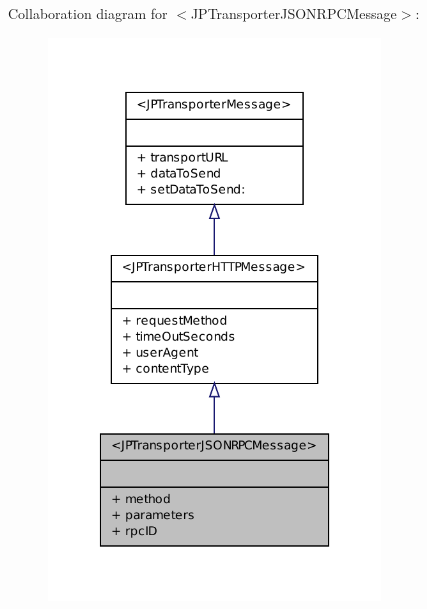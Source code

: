 Collaboration diagram for $<$JPTransporterJSONRPCMessage$>$:\nopagebreak
\begin{figure}[H]
\begin{center}
\leavevmode
\includegraphics[width=250pt]{a00171}
\end{center}
\end{figure}

